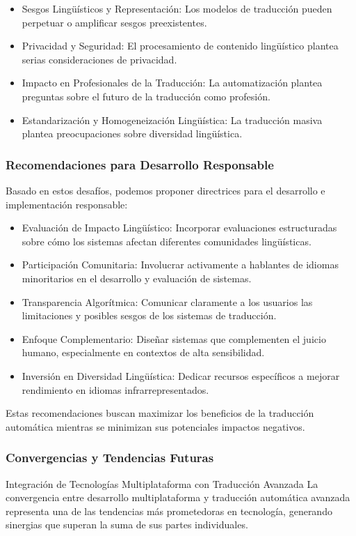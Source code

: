\begin{itemize}
    \item Sesgos Lingüísticos y Representación: Los modelos de traducción pueden perpetuar o amplificar sesgos preexistentes.
    \item Privacidad y Seguridad: El procesamiento de contenido lingüístico plantea serias consideraciones de privacidad.
    \item Impacto en Profesionales de la Traducción: La automatización plantea preguntas sobre el futuro de la traducción como profesión.
    \item Estandarización y Homogeneización Lingüística: La traducción masiva plantea preocupaciones sobre diversidad lingüística.
\end{itemize}

\subsubsection{Recomendaciones para Desarrollo Responsable}
Basado en estos desafíos, podemos proponer directrices para el desarrollo e implementación responsable:

\begin{itemize}
    \item Evaluación de Impacto Lingüístico: Incorporar evaluaciones estructuradas sobre cómo los sistemas afectan diferentes comunidades lingüísticas.
    \item Participación Comunitaria: Involucrar activamente a hablantes de idiomas minoritarios en el desarrollo y evaluación de sistemas.
    \item Transparencia Algorítmica: Comunicar claramente a los usuarios las limitaciones y posibles sesgos de los sistemas de traducción.
    \item Enfoque Complementario: Diseñar sistemas que complementen el juicio humano, especialmente en contextos de alta sensibilidad.
    \item Inversión en Diversidad Lingüística: Dedicar recursos específicos a mejorar rendimiento en idiomas infrarrepresentados.
\end{itemize}

Estas recomendaciones buscan maximizar los beneficios de la traducción automática mientras se minimizan sus potenciales impactos negativos.

\subsubsection{Convergencias y Tendencias Futuras}
Integración de Tecnologías Multiplataforma con Traducción Avanzada
La convergencia entre desarrollo multiplataforma y traducción automática avanzada representa una de las tendencias más prometedoras en tecnología, generando sinergias que superan la suma de sus partes individuales.

